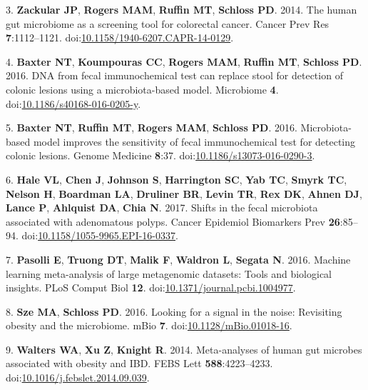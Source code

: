 \documentclass[
  11pt,
]{article}
\begin{document}
\leavevmode\hypertarget{ref-zackular_human_2014}{}%
3. \textbf{Zackular JP}, \textbf{Rogers MAM}, \textbf{Ruffin MT},
\textbf{Schloss PD}. 2014. The human gut microbiome as a screening tool
for colorectal cancer. Cancer Prev Res \textbf{7}:1112--1121.
doi:\href{https://doi.org/10.1158/1940-6207.CAPR-14-0129}{10.1158/1940-6207.CAPR-14-0129}.

\leavevmode\hypertarget{ref-baxter_dna_2016}{}%
4. \textbf{Baxter NT}, \textbf{Koumpouras CC}, \textbf{Rogers MAM},
\textbf{Ruffin MT}, \textbf{Schloss PD}. 2016. DNA from fecal
immunochemical test can replace stool for detection of colonic lesions
using a microbiota-based model. Microbiome \textbf{4}.
doi:\href{https://doi.org/10.1186/s40168-016-0205-y}{10.1186/s40168-016-0205-y}.

\leavevmode\hypertarget{ref-baxter_microbiota-based_2016}{}%
5. \textbf{Baxter NT}, \textbf{Ruffin MT}, \textbf{Rogers MAM},
\textbf{Schloss PD}. 2016. Microbiota-based model improves the
sensitivity of fecal immunochemical test for detecting colonic lesions.
Genome Medicine \textbf{8}:37.
doi:\href{https://doi.org/10.1186/s13073-016-0290-3}{10.1186/s13073-016-0290-3}.

\leavevmode\hypertarget{ref-hale_shifts_2017}{}%
6. \textbf{Hale VL}, \textbf{Chen J}, \textbf{Johnson S},
\textbf{Harrington SC}, \textbf{Yab TC}, \textbf{Smyrk TC},
\textbf{Nelson H}, \textbf{Boardman LA}, \textbf{Druliner BR},
\textbf{Levin TR}, \textbf{Rex DK}, \textbf{Ahnen DJ}, \textbf{Lance P},
\textbf{Ahlquist DA}, \textbf{Chia N}. 2017. Shifts in the fecal
microbiota associated with adenomatous polyps. Cancer Epidemiol
Biomarkers Prev \textbf{26}:85--94.
doi:\href{https://doi.org/10.1158/1055-9965.EPI-16-0337}{10.1158/1055-9965.EPI-16-0337}.

\leavevmode\hypertarget{ref-pasolli_machine_2016}{}%
7. \textbf{Pasolli E}, \textbf{Truong DT}, \textbf{Malik F},
\textbf{Waldron L}, \textbf{Segata N}. 2016. Machine learning
meta-analysis of large metagenomic datasets: Tools and biological
insights. PLoS Comput Biol \textbf{12}.
doi:\href{https://doi.org/10.1371/journal.pcbi.1004977}{10.1371/journal.pcbi.1004977}.

\leavevmode\hypertarget{ref-sze_looking_2016}{}%
8. \textbf{Sze MA}, \textbf{Schloss PD}. 2016. Looking for a signal in
the noise: Revisiting obesity and the microbiome. mBio \textbf{7}.
doi:\href{https://doi.org/10.1128/mBio.01018-16}{10.1128/mBio.01018-16}.

\leavevmode\hypertarget{ref-walters_meta-analyses_2014}{}%
9. \textbf{Walters WA}, \textbf{Xu Z}, \textbf{Knight R}. 2014.
Meta-analyses of human gut microbes associated with obesity and IBD.
FEBS Lett \textbf{588}:4223--4233.
doi:\href{https://doi.org/10.1016/j.febslet.2014.09.039}{10.1016/j.febslet.2014.09.039}.
\end{document}
